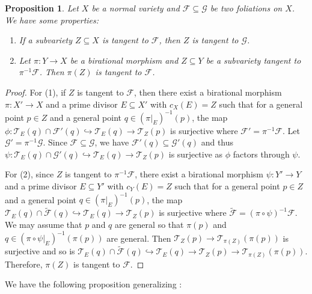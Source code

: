 \documentclass[12pt,reqno]{amsart}
\newtheorem{proposition}[theorem]{Proposition}
\theoremstyle{definition}
\newcommand\cF{{\mathcal{F}}}
\newcommand\cG{{\mathcal{G}}}
\newcommand\cT{{\mathcal{T}}}
\begin{document}
\begin{proposition}\label{property_tangent}
    Let $X$ be a normal variety and $\cF\subseteq\cG$ be two foliations on $X$. 
    We have some properties:
    \begin{enumerate}
        \item If a subvariety $Z\subseteq X$ is tangent to $\cF$, then $Z$ is tangent to $\cG$. 
        \item Let $\pi\colon Y\to X$ be a birational morphism and $Z\subseteq Y$ be a subvariety tangent to $\pi^{-1}\cF$. 
        Then $\pi(Z)$ is tangent to $\cF$. 
    \end{enumerate}
\end{proposition}
\begin{proof}
    For (1), if $Z$ is tangent to $\cF$, then there exist a birational morphism $\pi\colon X'\to X$ and a prime divisor $E\subseteq X'$ with $c_X(E)=Z$ such that for a general point $p\in Z$ and a general point $q\in(\pi\vert_E)^{-1}(p)$, the map $\phi\colon \cT_E(q)\cap\cF'(q)\hookrightarrow\cT_E(q)\to \cT_Z(p)$ is surjective where $\cF'=\pi^{-1}\cF$. 
    Let $\cG'=\pi^{-1}\cG$. 
    Since $\cF\subseteq\cG$, we have $\cF'(q)\subseteq\cG'(q)$ and thus $\psi\colon\cT_E(q)\cap\cG'(q)\hookrightarrow\cT_E(q)\to\cT_Z(p)$ is surjective as $\phi$ factors through $\psi$. 

    For (2), since $Z$ is tangent to $\pi^{-1}\cF$, there exist a birational morphism $\psi\colon Y'\to Y$ and a prime divisor $E\subseteq Y'$ with $c_Y(E)=Z$ such that for a general point $p\in Z$ and a general point $q\in(\pi\vert_E)^{-1}(p)$, the map $\cT_E(q)\cap\widetilde{\cF}(q)\hookrightarrow\cT_E(q)\to\cT_Z(p)$ is surjective where $\widetilde{\cF} = (\pi\circ\psi)^{-1}\cF$. 
    We may assume that $p$ and $q$ are general so that $\pi(p)$ and $q\in(\pi\circ\psi\vert_E)^{-1}(\pi(p))$ are general. 
    Then $\cT_Z(p)\to\cT_{\pi(Z)}(\pi(p))$ is surjective and so is $\cT_E(q)\cap\widetilde{\cF}(q)\hookrightarrow\cT_E(q)\to\cT_Z(p)\to\cT_{\pi(Z)}(\pi(p))$. 
    Therefore, $\pi(Z)$ is tangent to $\cF$. 
\end{proof}

We have the following proposition generalizing \cite[Lemma 3.3]{wang2023toric}:
\end{document}
